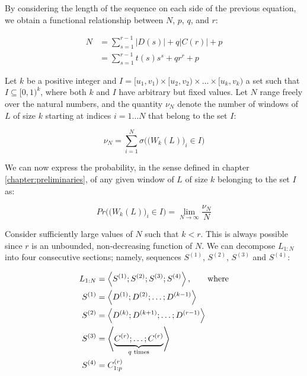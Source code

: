 \documentclass[11pt,a4paper]{tesis}
\theoremstyle{plain}
\theoremstyle{definition}
\begin{document}
By considering the length of the sequence on each side of the previous equation, we obtain a functional relationship between $N$, $p$, $q$, and $r$:

\begin{equation}\label{equation:n-p-q-r}
  \begin{aligned}
    N & = \sum_{s = 1}^{r - 1} |D(s)| + q |C(r)| + p \\
      & = \sum_{s = 1}^{r - 1} t(s) s^s + q r^r + p
  \end{aligned}
\end{equation}

Let $k$ be a positive integer and $I = [u_1, v_1) \times [u_2, v_2) \times \dots \times [u_k, v_k)$ a set such that $I \subseteq [0, 1)^k$, where both $k$ and $I$ have arbitrary but fixed values. Let $N$ range freely over the natural numbers, and the quantity $\nu_N$ denote the number of windows of $L$ of size $k$ starting at indices $i = 1 \dots N$ that belong to the set $I$:

\begin{equation*}
  \nu_N = \sum_{i = 1}^{N} \sigma\Big( \big( W_k(L) \big)_i \in I \Big)
\end{equation*}

We can now express the probability, in the sense defined in chapter \ref{chapter:preliminaries}, of any given window of $L$ of size $k$ belonging to the set $I$ as:

\begin{equation*}
  Pr\Big( \big( W_k(L) \big)_i \in I \Big) = \lim_{N \to \infty} \frac{\nu_N}{N}
\end{equation*}

Consider sufficiently large values of $N$ such that $k < r$. This is always possible since $r$ is an unbounded, non-decreasing function of $N$. We can decompose $L_{1:N}$ into four consecutive sections; namely, sequences $S^{(1)}$, $S^{(2)}$, $S^{(3)}$ and $S^{(4)}$:

\begin{equation*}
  \begin{aligned}
    L_{1:N} & = \left< S^{(1)} ; S^{(2)} ; S^{(3)} ; S^{(4)} \right> \text{, \hspace*{5mm} where} \\
    S^{(1)} & = \left< D^{(1)} ; D^{(2)} ; \dots ; D^{(k - 1)} \right> \\
    S^{(2)} & = \left< D^{(k)} ; D^{(k + 1)} ; \dots ; D^{(r - 1)} \right> \\
    S^{(3)} & = \left< \underbrace{C^{(r)} ; \dots ; C^{(r)}}_{q \text{ times}} \right> \\ 
    S^{(4)} & = C^{(r)}_{1:p}
  \end{aligned}
\end{equation*}
\end{document}
